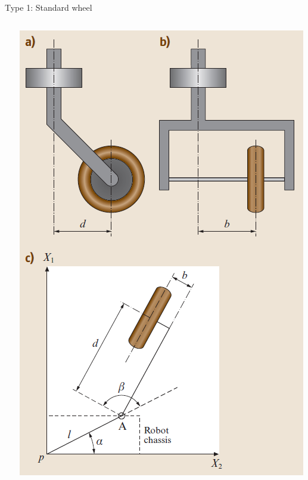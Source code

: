 \documentclass[compress]{beamer}
\begin{document}
\begin{frame}{Type 1: Standard wheel}
{\begin{columns}
\begin{column}{0.6\linewidth}
            \end{column}
            \begin{column}{0.4\linewidth}
                \begin{center}
                    \includegraphics[width=\linewidth]{std_wheel1}
                \end{center}
            \end{column}
        \end{columns}
    }

\end{frame}
\end{document}

